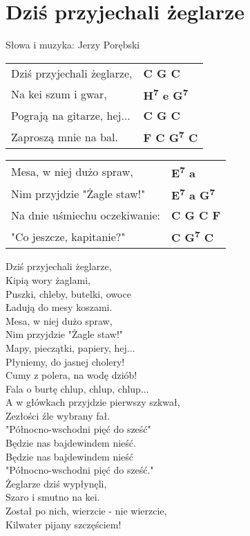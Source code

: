 \section{Dziś przyjechali żeglarze}

Słowa i muzyka: Jerzy Porębski

\vspace{2em}
\begin{tabular}{@{}p{7cm}@{}l@{}}
Dziś przyjechali żeglarze, & \bfseries C G C\\
Na kei szum i gwar, & \bfseries H\textsuperscript{7} e G\textsuperscript{7}\\
Pograją na gitarze, hej... & \bfseries C G C\\
Zaproszą mnie na bal. & \bfseries F C G\textsuperscript{7} C\\
\end{tabular}

\begin{tabular}{@{}p{7cm}@{}l@{}}
Mesa, w niej dużo spraw, & \bfseries E\textsuperscript{7} a\\
Nim przyjdzie "Żagle staw!" & \bfseries E\textsuperscript{7} a G\textsuperscript{7}\\
Na dnie uśmiechu oczekiwanie: & \bfseries C G C F\\
"Co jeszcze, kapitanie?" & \bfseries C G\textsuperscript{7} C\\
\end{tabular}

\vspace{1em}
Dziś przyjechali żeglarze, \\
Kipią wory żaglami, \\
Puszki, chleby, butelki, owoce \\
Ładują do mesy koszami. \\

Mesa, w niej dużo spraw, \\
Nim przyjdzie "Żagle staw!" \\
Mapy, pieczątki, papiery, hej... \\
Płyniemy, do jasnej cholery! \\

Cumy z polera, na wodę dziób! \\
Fala o burtę chlup, chlup, chlup... \\
A w główkach przyjdzie pierwszy szkwał, \\
Zezłości źle wybrany fał. \\

"Północno-wschodni pięć do sześć" \\
Będzie nas bajdewindem nieść. \\
Będzie nas bajdewindem nieść \\
"Północno-wschodni pięć do sześć." \\

Żeglarze dziś wypłynęli, \\
Szaro i smutno na kei. \\
Został po nich, wierzcie - nie wierzcie, \\
Kilwater pijany szczęściem! \\
